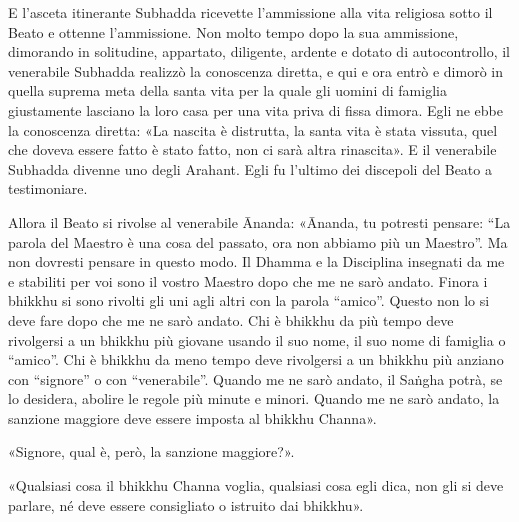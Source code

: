 E l’asceta itinerante Subhadda ricevette l’ammissione alla vita religiosa sotto
il Beato e ottenne l’ammissione. Non molto tempo dopo la sua ammissione,
dimorando in solitudine, appartato, diligente, ardente e dotato di
autocontrollo, il venerabile Subhadda realizzò la conoscenza diretta, e qui e
ora entrò e dimorò in quella suprema meta della santa vita per la quale gli
uomini di famiglia giustamente lasciano la loro casa per una vita priva di fissa
dimora. Egli ne ebbe la conoscenza diretta: «La nascita è distrutta, la santa
vita è stata vissuta, quel che doveva essere fatto è stato fatto, non ci sarà
altra rinascita». E il venerabile Subhadda divenne uno degli Arahant. Egli fu
l’ultimo dei discepoli del Beato a testimoniare.

Allora il Beato si rivolse al venerabile Ānanda: «Ānanda, tu potresti pensare:
“La parola del Maestro è una cosa del passato, ora non abbiamo più un Maestro”.
Ma non dovresti pensare in questo modo. Il Dhamma e la Disciplina insegnati da
me e stabiliti per voi sono il vostro Maestro dopo che me ne sarò andato. Finora
i bhikkhu si sono rivolti gli uni agli altri con la parola “amico”. Questo non
lo si deve fare dopo che me ne sarò andato. Chi è bhikkhu da più tempo deve
rivolgersi a un bhikkhu più giovane usando il suo nome, il suo nome di famiglia
o “amico”. Chi è bhikkhu da meno tempo deve rivolgersi a un bhikkhu più anziano
con “signore” o con “venerabile”. Quando me ne sarò andato, il Saṅgha potrà, se
lo desidera, abolire le regole più minute e minori. Quando me ne sarò andato, la
sanzione maggiore deve essere imposta al bhikkhu Channa».

«Signore, qual è, però, la sanzione maggiore?».

«Qualsiasi cosa il bhikkhu Channa voglia, qualsiasi cosa egli dica, non gli si
deve parlare, né deve essere consigliato o istruito dai bhikkhu».

